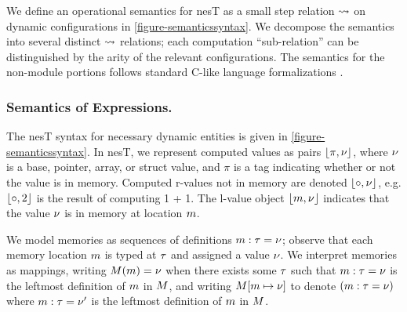 We define an operational semantics for nesT as a small step relation
$\leadsto$ on dynamic configurations in
\autoref{figure-semanticssyntax}.  We decompose the semantics into
several distinct $\leadsto$ relations; each computation
``sub-relation'' can be distinguished by the arity of the relevant
configurations.
The semantics for the non-module portions follows standard C-like
language formalizations \cite{Leroy-compcert-06,grossman03}.

\subsubsection{Semantics of Expressions.}

The nesT syntax for necessary dynamic entities is given in
\autoref{figure-semanticssyntax}.  In nesT, we represent computed
values as pairs $\lfloor \pi,{\nu} \rfloor$, where ${\nu}$ is a base, pointer,
array, or struct value, and $\pi$ is a tag indicating whether or not
the value is in memory.  Computed r-values not in memory are denoted
$\lfloor \circ,{\nu} \rfloor$, e.g. $\lfloor \circ,2 \rfloor$ is the result of computing
1 + 1. The l-value object $\lfloor m,{\nu} \rfloor$ indicates that the value
${\nu}$ is in memory at location $m$.

We model memories as sequences of definitions $m : \tau = {\nu}$;
observe that each memory location $m$ is typed at $\tau$ and assigned
a value ${\nu}$. We interpret memories as mappings, writing
$M(m) = {\nu}$ when there exists some $\tau$ such that $m : \tau
= {\nu}$ is the leftmost definition of $m$ in $M$, and writing
$M[m \mapsto {\nu}]$ to denote $(m : \tau = {\nu})$ where $m :
\tau = {\nu}'$ is the leftmost definition of $m$ in $M$.%


